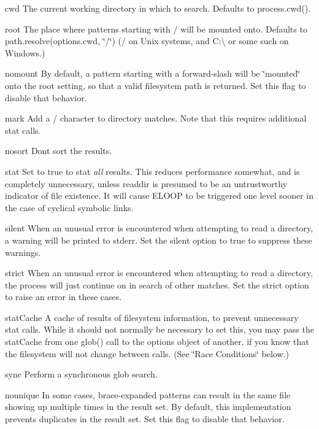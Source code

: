 \begin{DoxyItemize}
\item {\ttfamily cwd} The current working directory in which to search. Defaults to {\ttfamily process.\+cwd()}.
\item {\ttfamily root} The place where patterns starting with {\ttfamily /} will be mounted onto. Defaults to {\ttfamily path.\+resolve(options.\+cwd, \char`\"{}/\char`\"{})} ({\ttfamily /} on Unix systems, and {\ttfamily C\+:\textbackslash{}} or some such on Windows.)
\item {\ttfamily nomount} By default, a pattern starting with a forward-\/slash will be \char`\"{}mounted\char`\"{} onto the root setting, so that a valid filesystem path is returned. Set this flag to disable that behavior.
\item {\ttfamily mark} Add a {\ttfamily /} character to directory matches. Note that this requires additional stat calls.
\item {\ttfamily nosort} Don\textquotesingle{}t sort the results.
\item {\ttfamily stat} Set to true to stat {\itshape all} results. This reduces performance somewhat, and is completely unnecessary, unless {\ttfamily readdir} is presumed to be an untrustworthy indicator of file existence. It will cause E\+L\+O\+O\+P to be triggered one level sooner in the case of cyclical symbolic links.
\item {\ttfamily silent} When an unusual error is encountered when attempting to read a directory, a warning will be printed to stderr. Set the {\ttfamily silent} option to true to suppress these warnings.
\item {\ttfamily strict} When an unusual error is encountered when attempting to read a directory, the process will just continue on in search of other matches. Set the {\ttfamily strict} option to raise an error in these cases.
\item {\ttfamily stat\+Cache} A cache of results of filesystem information, to prevent unnecessary stat calls. While it should not normally be necessary to set this, you may pass the stat\+Cache from one glob() call to the options object of another, if you know that the filesystem will not change between calls. (See \char`\"{}\+Race Conditions\char`\"{} below.)
\item {\ttfamily sync} Perform a synchronous glob search.
\item {\ttfamily nounique} In some cases, brace-\/expanded patterns can result in the same file showing up multiple times in the result set. By default, this implementation prevents duplicates in the result set. Set this flag to disable that behavior.

\end{DoxyItemize}
